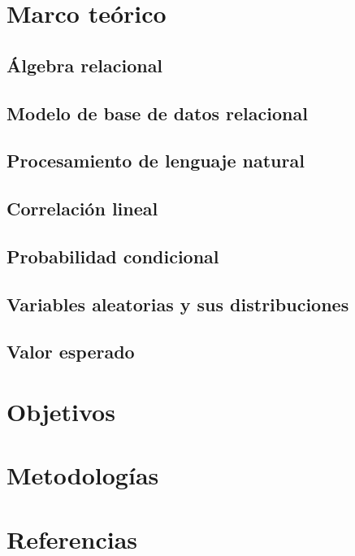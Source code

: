 \documentclass[12pt,letterpaper]{article}
\begin{document}
\maketitle

\tableofcontents

\section {Marco teórico}\label{ch:marcot}
\subsection {Álgebra relacional}\label{ch:algebra}

\subsection {Modelo de base de datos relacional}\label{ch:rdb}

\subsection {Procesamiento de lenguaje natural}\label{ch:nlp}

\subsection {Correlación lineal}\label{ch:corrl}

\subsection {Probabilidad condicional}\label{ch:pcond}

\subsection {Variables aleatorias y sus distribuciones}\label{ch:vayd}

\subsection {Valor esperado}\label{ch:valesp}

\section {Objetivos}\label{ch:objetivos}

\section {Metodologías}\label{ch:metod}
\section {Referencias}\label{ch:refs}
\printbibliography[heading=none]
\end{document}
